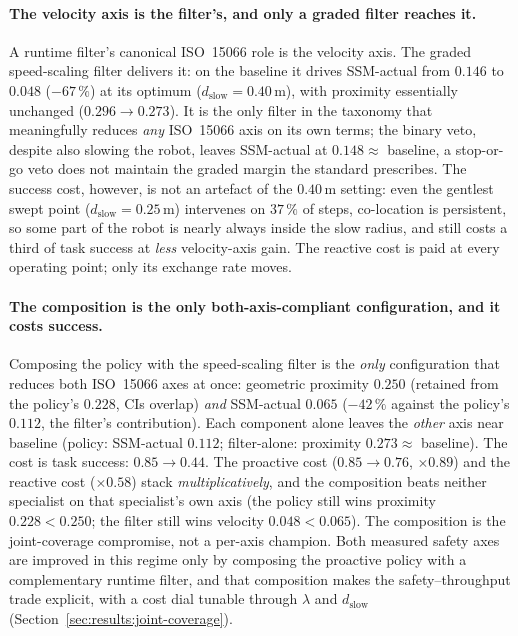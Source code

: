 \documentclass[11pt,a4paper]{report}
\newcommand{\ssm}{SSM}
\newcommand{\iso}{ISO~15066}
\begin{document}
\paragraph{The velocity axis is the filter's, and only a graded filter
reaches it.}
A runtime filter's canonical \iso{} role is the velocity axis. The
graded speed-scaling filter delivers it: on the baseline it drives
\ssm{}-actual from $0.146$ to $0.048$ ($-67\,\%$) at its optimum
($d_{\mathrm{slow}} = 0.40$\,m), with proximity essentially unchanged
($0.296 \rightarrow 0.273$). It is the only filter in the taxonomy
that meaningfully reduces \emph{any} \iso{} axis on its own terms;
the binary veto, despite also slowing the robot, leaves
\ssm{}-actual at $0.148 \approx$ baseline, a stop-or-go veto does not
maintain the graded margin the standard prescribes. The success
cost, however, is not an artefact of the $0.40$\,m setting: even the
gentlest swept point ($d_{\mathrm{slow}} = 0.25$\,m) intervenes on
$37\,\%$ of steps, co-location is persistent, so some part of the
robot is nearly always inside the slow radius, and still costs a
third of task success at \emph{less} velocity-axis gain. The
reactive cost is paid at every operating point; only its exchange
rate moves.

\paragraph{The composition is the only both-axis-compliant
configuration, and it costs success.}
Composing the policy with the speed-scaling filter is the \emph{only}
configuration that reduces both \iso{} axes at once: geometric
proximity $0.250$ (retained from the policy's $0.228$, CIs overlap)
\emph{and} \ssm{}-actual $0.065$ ($-42\,\%$ against the policy's
$0.112$, the filter's contribution). Each component alone leaves the
\emph{other} axis near baseline (policy: \ssm{}-actual $0.112$;
filter-alone: proximity $0.273 \approx$ baseline). The cost is task
success: $0.85 \rightarrow 0.44$. The proactive cost ($0.85 \to 0.76$,
$\times 0.89$) and the reactive cost ($\times 0.58$) stack
\emph{multiplicatively}, and the composition beats neither specialist
on that specialist's own axis (the policy still wins proximity
$0.228 < 0.250$; the filter still wins velocity $0.048 < 0.065$). The
composition is the joint-coverage compromise, not a per-axis champion.
Both measured safety axes are improved in this regime only by composing
the proactive policy with a complementary runtime filter, and that
composition makes the safety--throughput trade explicit, with a cost
dial tunable through $\lambda$ and $d_{\mathrm{slow}}$
(Section~\ref{sec:results:joint-coverage}).
\end{document}
